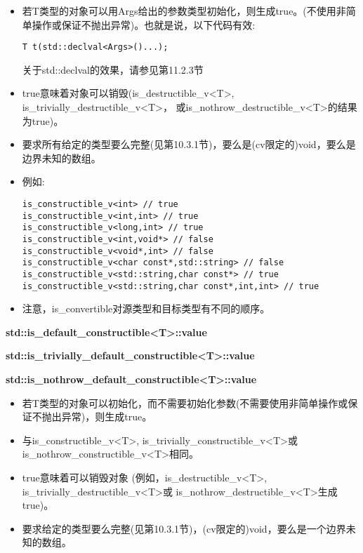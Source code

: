 \begin{itemize}
\item 
若T类型的对象可以用Args给出的参数类型初始化，则生成true。(不使用非简单操作或保证不抛出异常)。也就是说，以下代码有效:

\begin{lstlisting}[style=styleCXX]
T t(std::declval<Args>()...);
\end{lstlisting}

\begin{tcolorbox}[colback=webgreen!5!white,colframe=webgreen!75!black]
\hspace*{0.75cm}关于std::declval的效果，请参见第11.2.3节
\end{tcolorbox}

\item
true意味着对象可以销毁(is\_destructible\_v<T>, is\_trivially\_destructible\_v<T>， 或is\_nothrow\_destructible\_v<T>的结果为true)。

\item
要求所有给定的类型要么完整(见第10.3.1节)，要么是(cv限定的)void，要么是边界未知的数组。

\item
例如:
\begin{lstlisting}[style=styleCXX]
is_constructible_v<int> // true
is_constructible_v<int,int> // true
is_constructible_v<long,int> // true
is_constructible_v<int,void*> // false
is_constructible_v<void*,int> // false
is_constructible_v<char const*,std::string> // false
is_constructible_v<std::string,char const*> // true
is_constructible_v<std::string,char const*,int,int> // true
\end{lstlisting}

\item
注意，is\_convertible对源类型和目标类型有不同的顺序。
\end{itemize}

\textbf{std::is\_default\_constructible<T>::value}

\textbf{std::is\_trivially\_default\_constructible<T>::value}

\textbf{std::is\_nothrow\_default\_constructible<T>::value}

\begin{itemize}
\item 
若T类型的对象可以初始化，而不需要初始化参数(不需要使用非简单操作或保证不抛出异常)，则生成true。

\item 
与is\_constructible\_v<T>, is\_trivially\_constructible\_v<T>或 is\_nothrow\_constructible\_v<T>相同。

\item 
true意味着可以销毁对象 (例如，is\_destructible\_v<T>, is\_trivially\_destructible\_v<T>或 is\_nothrow\_destructible\_v<T>生成true)。

\item 
要求给定的类型要么完整(见第10.3.1节)，(cv限定的)void，要么是一个边界未知的数组。
\end{itemize}

